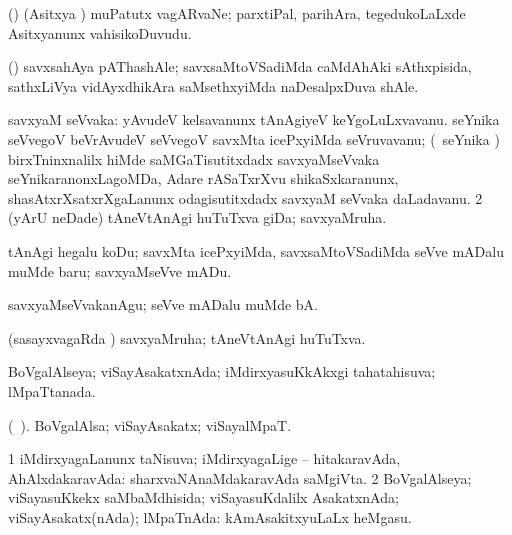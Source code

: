 {{{{{{{{{{{{{\bentry
{}
\gl{\nA}
\expl{}
\bmng
 (\nAyxshA) (Asitxya \vi) muPatutx vagARvaNe; parxtiPal, parihAra, tegedukoLaLxde Asitxyanunx vahisikoDuvudu. 
\emng
\eentry

\bentry
{} 
\gl{\nA}
\expl{}
\bmng
\emng
\eentry

\bentry 
{} 
\gl{\nA}
\expl{}
\bmng
\emng
\eentry

\bentry 
{}
\gl{\nA}
\expl{}
\bmng
 (\birx) savxsahAya pAThashAle; savxsaMtoVSadiMda caMdAhAki sAthxpisida, sathxLiVya vidAyxdhikAra saMsethxyiMda naDesalpxDuva shAle. 
\emng
\eentry

\bentry 
{} 
\gl{\nA}
\expl{}
\bmng
\bnum
{} savxyaM seVvaka: 
\banum
{} yAvudeV kelsavanunx tAnAgiyeV keYgoLuLxvavanu. 
 seYnika seVvegoV beVrAvudeV seVvegoV savxMta icePxyiMda seVruvavanu; (\kanmu\ seYnika \ca) birxTninxnalilx hiMde saMGaTisutitxdadx savxyaMseVvaka seYnikaranonxLagoMDa, Adare rASaTxrXvu shikaSxkaranunx, shasAtxrXsatxrXgaLanunx odagisutitxdadx savxyaM seVvaka daLadavanu. 
\eanum
\numie
\num{2} (yArU neDade) tAneVtAnAgi huTuTxva giDa; savxyaMruha. 
\enum
\emng
\eentry

\bentry
{} 
\gl{\sakirx}
\expl{}
\bmng
 tAnAgi hegalu koDu; savxMta icePxyiMda, savxsaMtoVSadiMda seVve mADalu muMde baru; savxyaMseVve mADu. 
\emng

\noindent 
\gl{\akirx}
\expl{}
\bmng
 savxyaMseVvakanAgu; seVve mADalu muMde bA. 
\emng
\eentry

\bentry 
{} 
\gl{\gu}
\expl{}
\bmng
 (sasayxvagaRda \vi) savxyaMruha; tAneVtAnAgi huTuTxva. 
\emng
\eentry

\bentry 
{} 
\gl{\gu}
\expl{}
\bmng
 BoVgalAlseya; viSayAsakatxnAda; iMdirxyasuKkAkxgi tahatahisuva; lMpaTtanada. 
\emng
\eentry

\bentry 
{} 
\gl{\nA}(\bava\ ). 
\bmng
 BoVgalAlsa; viSayAsakatx; viSayalMpaT. 
\emng
\eentry

\bentry 
{} 
\gl{\gu}
\expl{}
\bmng
\bnum
\num{1} iMdirxyagaLanunx taNisuva; iMdirxyagaLige -- hitakaravAda, AhAlxdakaravAda:  sharxvaNAnaMdakaravAda saMgiVta. 
\num{2} BoVgalAlseya; viSayasuKkekx saMbaMdhisida; viSayasuKdalilx AsakatxnAda; viSayAsakatx(nAda); lMpaTnAda:  kAmAsakitxyuLaLx heMgasu. 
\enum
\emng
\eentry

}}}}}}}}}}}}}
